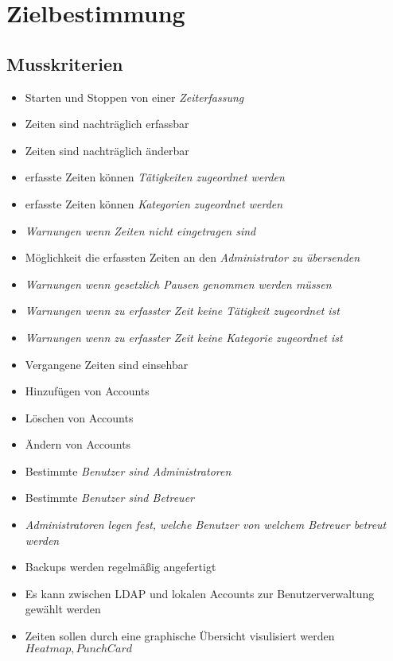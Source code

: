 \section{Zielbestimmung}

\subsection{Musskriterien}

\begin{itemize}
	\item Starten und Stoppen von einer \em Zeiterfassung \em
	\item Zeiten sind nachträglich erfassbar
	\item Zeiten sind nachträglich änderbar
	\item erfasste Zeiten können \em Tätigkeiten \em zugeordnet werden
	\item erfasste Zeiten können \em Kategorien \em zugeordnet werden
	\item \em Warnungen \em wenn Zeiten nicht eingetragen sind
	\item Möglichkeit die erfassten Zeiten an den \em Administrator \em zu übersenden
	\item \em Warnungen \em wenn gesetzlich Pausen genommen werden müssen
	\item \em Warnungen \em wenn zu erfasster Zeit keine \em Tätigkeit \em zugeordnet ist
	\item \em Warnungen \em wenn zu erfasster Zeit keine \em Kategorie \em zugeordnet ist
	\item Vergangene Zeiten sind einsehbar
	\item Hinzufügen von Accounts
	\item Löschen von Accounts
	\item Ändern von Accounts
	\item Bestimmte \em Benutzer \em sind \em Administratoren \em
	\item Bestimmte \em Benutzer \em sind \em Betreuer \em
	\item \em Administratoren \em legen fest, welche \em Benutzer \em von welchem \em Betreuer \em betreut werden
	\item Backups werden regelmäßig angefertigt
	\item Es kann zwischen LDAP und lokalen Accounts zur Benutzerverwaltung gewählt werden
	\item Zeiten sollen durch eine graphische Übersicht visulisiert werden \(Heatmap, Punch Card\)
\end{itemize}


